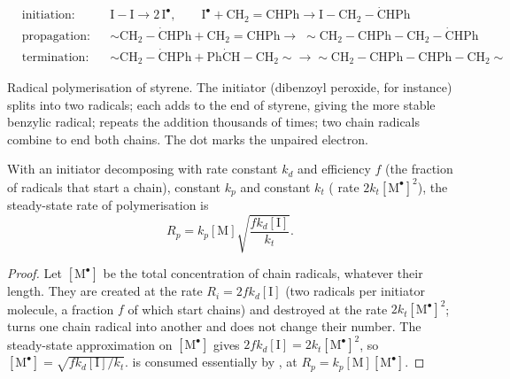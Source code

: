 \begin{omfigure}
\begin{align*}
&\text{initiation:} && \mathrm{I{-}I} \longrightarrow 2\,\mathrm{I^{\bullet}}, \qquad
\mathrm{I^{\bullet} + CH_2{=}CHPh \longrightarrow I{-}CH_2{-}\dot{C}HPh} \\
&\text{propagation:} && {\sim}\mathrm{CH_2{-}\dot{C}HPh + CH_2{=}CHPh \longrightarrow}\;
{\sim}\mathrm{CH_2{-}CHPh{-}CH_2{-}\dot{C}HPh} \\
&\text{termination:} && {\sim}\mathrm{CH_2{-}\dot{C}HPh + Ph\dot{C}H{-}CH_2}{\sim} \longrightarrow
{\sim}\mathrm{CH_2{-}CHPh{-}CHPh{-}CH_2}{\sim}
\end{align*}

{\small Radical polymerisation of styrene. The initiator  (dibenzoyl peroxide, for instance)
splits into two radicals; each adds to the  end of styrene, giving the more stable benzylic
radical;  repeats the addition thousands of times; two chain radicals combine to end both
chains. The dot marks the unpaired electron.}
\end{omfigure}

\begin{theorem}\label{thm:b2:polymer-synthesis:radical-rate}
With an initiator decomposing with rate constant $k_d$ and efficiency $f$ (the fraction of radicals that
start a chain),  constant $k_p$ and  constant $k_t$ ( rate $2k_t
[\mathrm{M^\bullet}]^2$), the steady-state rate of polymerisation is
\begin{equation*}
R_p = k_p [\mathrm M] \sqrt{\frac{f k_d [\mathrm I]}{k_t}}.
\end{equation*}
\end{theorem}

\begin{proof}
Let $[\mathrm{M^\bullet}]$ be the total concentration of chain radicals, whatever their length. They are
created at the rate $R_i = 2fk_d[\mathrm I]$ (two radicals per initiator molecule, a fraction $f$ of
which start chains) and destroyed at the rate $2k_t[\mathrm{M^\bullet}]^2$;  turns one chain
radical into another and does not change their number. The steady-state approximation on
$[\mathrm{M^\bullet}]$ gives $2fk_d[\mathrm I] = 2k_t[\mathrm{M^\bullet}]^2$, so $[\mathrm{M^\bullet}] =
\sqrt{fk_d[\mathrm I]/k_t}$.  is consumed essentially by , at $R_p =
k_p[\mathrm M][\mathrm{M^\bullet}]$.
\end{proof}

